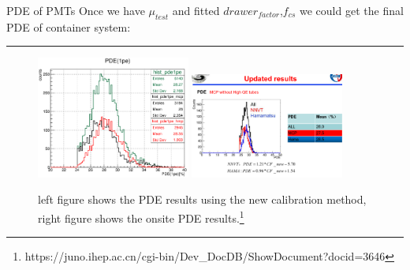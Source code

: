 \documentclass[11pt,compress,xcolor=x11names,UTF8]{beamer}
\begin{document}
\begin{frame}{PDE of PMTs}
Once we have $\mu_{test}$ and fitted $drawer_{factor}$,$f_{cs}$ we could get the final PDE of container system:
\hrule{\textwidth}
\begin{figure}
\centering
\includegraphics[width=0.45\textwidth]{pde_res}
\includegraphics[width=0.45\textwidth]{hqpde}
\caption{left figure shows the PDE results using the new calibration method, right figure shows the onsite PDE results.\footnote{https://juno.ihep.ac.cn/cgi-bin/Dev\_DocDB/ShowDocument?docid=3646}}
\end{figure}
\end{frame}
\end{document}
